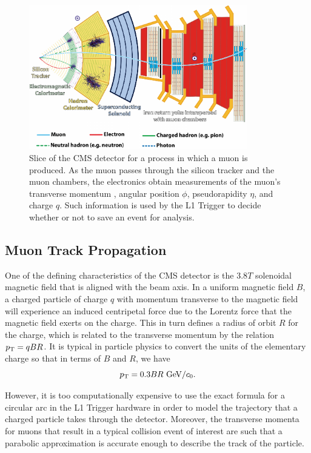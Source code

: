 \begin{figure}[htbp]
  \centering
  \includegraphics[width=0.85\textwidth]{fig/TPS/CMSslice_whiteBackground.pdf}
  \caption{
    Slice of the CMS detector for a process in which a muon is produced.
    As the muon passes through the silicon tracker and the muon chambers, the electronics obtain measurements of the muon's transverse momentum \pt, angular position $\phi$, pseudorapidity $\eta$, and charge $q$.
    Such information is used by the L1 Trigger to decide whether or not to save an event for analysis.
  }
  \label{fig:CMSslice}
\end{figure}

\subsection{Muon Track Propagation}
\label{subsec:prop}

One of the defining characteristics of the CMS detector is the $3.8\unit{T}$ solenoidal magnetic field that is aligned with the beam axis.
In a uniform magnetic field $B$, a charged particle of charge $q$ with momentum transverse to the magnetic field \pt will experience an induced centripetal force due to the Lorentz force that the magnetic field exerts on the charge.
This in turn defines a radius of orbit $R$ for the charge, which is related to the transverse momentum \pt by the relation $p_\mathrm{T}=qBR$.
It is typical in particle physics to convert the units of the elementary charge so that in terms of $B$ and $R$, we have
\begin{equation}\label{eq:pt}
  \pt=0.3BR\unit{GeV/\clight}.
\end{equation}

However, it is too computationally expensive to use the exact formula for a circular arc in the L1 Trigger hardware in order to model the trajectory that a charged particle takes through the detector.
Moreover, the transverse momenta for muons that result in a typical collision event of interest are such that a parabolic approximation is accurate enough to describe the track of the particle.

